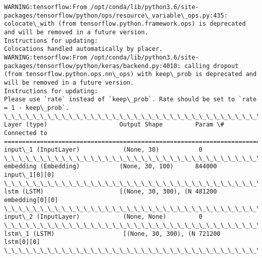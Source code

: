 \documentclass[11pt]{article}
\begin{document}
    \begin{Verbatim}[commandchars=\\\{\}]
WARNING:tensorflow:From /opt/conda/lib/python3.6/site-packages/tensorflow/python/ops/resource\_variable\_ops.py:435: colocate\_with (from tensorflow.python.framework.ops) is deprecated and will be removed in a future version.
Instructions for updating:
Colocations handled automatically by placer.
WARNING:tensorflow:From /opt/conda/lib/python3.6/site-packages/tensorflow/python/keras/backend.py:4010: calling dropout (from tensorflow.python.ops.nn\_ops) with keep\_prob is deprecated and will be removed in a future version.
Instructions for updating:
Please use `rate` instead of `keep\_prob`. Rate should be set to `rate = 1 - keep\_prob`.
\_\_\_\_\_\_\_\_\_\_\_\_\_\_\_\_\_\_\_\_\_\_\_\_\_\_\_\_\_\_\_\_\_\_\_\_\_\_\_\_\_\_\_\_\_\_\_\_\_\_\_\_\_\_\_\_\_\_\_\_\_\_\_\_\_\_\_\_\_\_\_\_\_\_\_\_\_\_\_\_\_\_\_\_\_\_\_\_\_\_\_\_\_\_\_\_\_\_
Layer (type)                    Output Shape         Param \#     Connected to                     
==================================================================================================
input\_1 (InputLayer)            (None, 30)           0                                            
\_\_\_\_\_\_\_\_\_\_\_\_\_\_\_\_\_\_\_\_\_\_\_\_\_\_\_\_\_\_\_\_\_\_\_\_\_\_\_\_\_\_\_\_\_\_\_\_\_\_\_\_\_\_\_\_\_\_\_\_\_\_\_\_\_\_\_\_\_\_\_\_\_\_\_\_\_\_\_\_\_\_\_\_\_\_\_\_\_\_\_\_\_\_\_\_\_\_
embedding (Embedding)           (None, 30, 100)      844000      input\_1[0][0]                    
\_\_\_\_\_\_\_\_\_\_\_\_\_\_\_\_\_\_\_\_\_\_\_\_\_\_\_\_\_\_\_\_\_\_\_\_\_\_\_\_\_\_\_\_\_\_\_\_\_\_\_\_\_\_\_\_\_\_\_\_\_\_\_\_\_\_\_\_\_\_\_\_\_\_\_\_\_\_\_\_\_\_\_\_\_\_\_\_\_\_\_\_\_\_\_\_\_\_
lstm (LSTM)                     [(None, 30, 300), (N 481200      embedding[0][0]                  
\_\_\_\_\_\_\_\_\_\_\_\_\_\_\_\_\_\_\_\_\_\_\_\_\_\_\_\_\_\_\_\_\_\_\_\_\_\_\_\_\_\_\_\_\_\_\_\_\_\_\_\_\_\_\_\_\_\_\_\_\_\_\_\_\_\_\_\_\_\_\_\_\_\_\_\_\_\_\_\_\_\_\_\_\_\_\_\_\_\_\_\_\_\_\_\_\_\_
input\_2 (InputLayer)            (None, None)         0                                            
\_\_\_\_\_\_\_\_\_\_\_\_\_\_\_\_\_\_\_\_\_\_\_\_\_\_\_\_\_\_\_\_\_\_\_\_\_\_\_\_\_\_\_\_\_\_\_\_\_\_\_\_\_\_\_\_\_\_\_\_\_\_\_\_\_\_\_\_\_\_\_\_\_\_\_\_\_\_\_\_\_\_\_\_\_\_\_\_\_\_\_\_\_\_\_\_\_\_
lstm\_1 (LSTM)                   [(None, 30, 300), (N 721200      lstm[0][0]                       
\_\_\_\_\_\_\_\_\_\_\_\_\_\_\_\_\_\_\_\_\_\_\_\_\_\_\_\_\_\_\_\_\_\_\_\_\_\_\_\_\_\_\_\_\_\_\_\_\_\_\_\_\_\_\_\_\_\_\_\_\_\_\_\_\_\_\_\_\_\_\_\_\_\_\_\_\_\_\_\_\_\_\_\_\_\_\_\_\_\_\_\_\_\_\_\_\_\_

\end{Verbatim}
\end{document}
